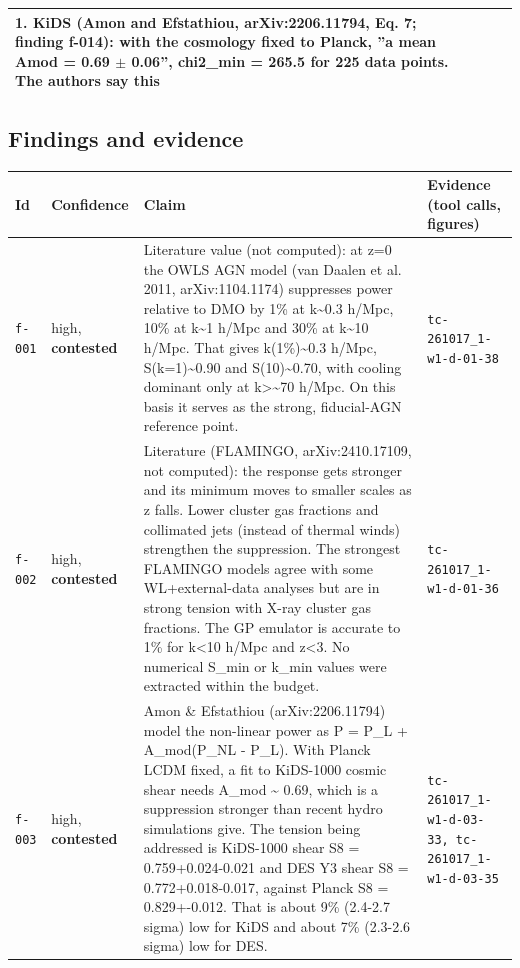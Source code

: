\documentclass[11pt,a4paper]{article}
\begin{document}
\begin{longtable}{@{}p{}p{}p{}p{}@{}}
1. KiDS (Amon and Efstathiou, arXiv:2206.11794, Eq. 7; finding f-014): with the cosmology fixed to Planck, ''a mean Amod = 0.69 $\pm$ 0.06'', chi2\_min = 265.5 for 225 data points. The authors say this  \\
\bottomrule\end{longtable}
\subsection{Findings and evidence}
\begin{longtable}{@{}p{}p{}p{}p{}@{}}
\toprule Id & Confidence & Claim & Evidence (tool calls, figures) \\ \midrule \endhead
\texttt{f-001} & high, \textbf{contested} & Literature value (not computed): at z=0 the OWLS AGN model (van Daalen et al. 2011, arXiv:1104.1174) suppresses power relative to DMO by 1\% at k\textasciitilde{}0.3 h/Mpc, 10\% at k\textasciitilde{}1 h/Mpc and 30\% at k\textasciitilde{}10 h/Mpc. That gives k(1\%)\textasciitilde{}0.3 h/Mpc, S(k=1)\textasciitilde{}0.90 and S(10)\textasciitilde{}0.70, with cooling dominant only at k\textgreater{}\textasciitilde{}70 h/Mpc. On this basis it serves as the strong, fiducial-AGN reference point. & \texttt{tc-261017\_\allowbreak{}1-w1-d-01-38} \\
\texttt{f-002} & high, \textbf{contested} & Literature (FLAMINGO, arXiv:2410.17109, not computed): the response gets stronger and its minimum moves to smaller scales as z falls. Lower cluster gas fractions and collimated jets (instead of thermal winds) strengthen the suppression. The strongest FLAMINGO models agree with some WL+external-data analyses but are in strong tension with X-ray cluster gas fractions. The GP emulator is accurate to 1\% for k\textless{}10 h/Mpc and z\textless{}3. No numerical S\_min or k\_min values were extracted within the budget. & \texttt{tc-261017\_\allowbreak{}1-w1-d-01-36} \\
\texttt{f-003} & high, \textbf{contested} & Amon \& Efstathiou (arXiv:2206.11794) model the non-linear power as P = P\_L + A\_mod(P\_NL - P\_L). With Planck LCDM fixed, a fit to KiDS-1000 cosmic shear needs A\_mod \textasciitilde{} 0.69, which is a suppression stronger than recent hydro simulations give. The tension being addressed is KiDS-1000 shear S8 = 0.759+0.024-0.021 and DES Y3 shear S8 = 0.772+0.018-0.017, against Planck S8 = 0.829+-0.012. That is about 9\% (2.4-2.7 sigma) low for KiDS and about 7\% (2.3-2.6 sigma) low for DES. & \texttt{tc-261017\_\allowbreak{}1-w1-d-03-33,\allowbreak{} tc-261017\_\allowbreak{}1-w1-d-03-35} \\

\end{longtable}
\end{document}
